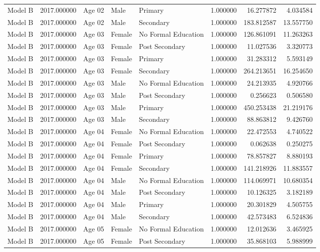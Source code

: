 \begin{table}[ht]
\begin{tabular}{lrlllrrr}
Model B & 2017.000000 & Age 02 & Male & Primary & 1.000000 & 16.277872 & 4.034584 \\
Model B & 2017.000000 & Age 02 & Male & Secondary & 1.000000 & 183.812587 & 13.557750 \\
Model B & 2017.000000 & Age 03 & Female & No Formal Education & 1.000000 & 126.861091 & 11.263263 \\
Model B & 2017.000000 & Age 03 & Female & Post Secondary & 1.000000 & 11.027536 & 3.320773 \\
Model B & 2017.000000 & Age 03 & Female & Primary & 1.000000 & 31.283312 & 5.593149 \\
Model B & 2017.000000 & Age 03 & Female & Secondary & 1.000000 & 264.213651 & 16.254650 \\
Model B & 2017.000000 & Age 03 & Male & No Formal Education & 1.000000 & 24.213935 & 4.920766 \\
Model B & 2017.000000 & Age 03 & Male & Post Secondary & 1.000000 & 0.256623 & 0.506580 \\
Model B & 2017.000000 & Age 03 & Male & Primary & 1.000000 & 450.253438 & 21.219176 \\
Model B & 2017.000000 & Age 03 & Male & Secondary & 1.000000 & 88.863812 & 9.426760 \\
Model B & 2017.000000 & Age 04 & Female & No Formal Education & 1.000000 & 22.472553 & 4.740522 \\
Model B & 2017.000000 & Age 04 & Female & Post Secondary & 1.000000 & 0.062638 & 0.250275 \\
Model B & 2017.000000 & Age 04 & Female & Primary & 1.000000 & 78.857827 & 8.880193 \\
Model B & 2017.000000 & Age 04 & Female & Secondary & 1.000000 & 141.218926 & 11.883557 \\
Model B & 2017.000000 & Age 04 & Male & No Formal Education & 1.000000 & 114.069971 & 10.680354 \\
Model B & 2017.000000 & Age 04 & Male & Post Secondary & 1.000000 & 10.126325 & 3.182189 \\
Model B & 2017.000000 & Age 04 & Male & Primary & 1.000000 & 20.301829 & 4.505755 \\
Model B & 2017.000000 & Age 04 & Male & Secondary & 1.000000 & 42.573483 & 6.524836 \\
Model B & 2017.000000 & Age 05 & Female & No Formal Education & 1.000000 & 12.012636 & 3.465925 \\
Model B & 2017.000000 & Age 05 & Female & Post Secondary & 1.000000 & 35.868103 & 5.988999 \\

\end{tabular}
\end{table}
